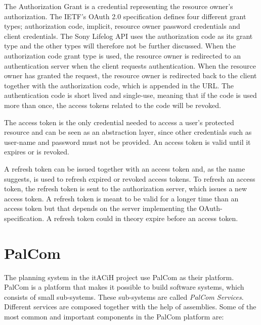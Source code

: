 \documentclass{cslthse-msc}
\begin{document}
The Authorization Grant is a credential representing the resource owner's authorization. The IETF's OAuth 2.0 specification defines four different grant types; authorization code, implicit, resource owner password credentials and client credentials. The Sony Lifelog API uses the authorization code as its grant type and the other types will therefore not be further discussed\cite{LifeLogAuth}. When the authorization code grant type is used, the resource owner is redirected to an authentication server when the client requests authentication. When the resource owner has granted the request, the resource owner is redirected back to the client together with the authorization code, which is appended in the URL. The authentication code is short lived and single-use, meaning that if the code is used more than once, the access tokens related to the code will be revoked.

The access token is the only credential needed to access a user's protected resource and can be seen as an abstraction layer, since other credentials such as user-name and password must not be provided. An access token is valid until it expires or is revoked.  

A refresh token can be issued together with an access token and, as the name suggests, is used to refresh expired or revoked access tokens. To refresh an access token, the refresh token is sent to the authorization server, which issues a new access token. A refresh token is meant to be valid for a longer time than an access token but that depends on the server implementing the OAuth-specification. A refresh token could in theory expire before an access token. 

\section{PalCom}
The planning system in the itACiH project use PalCom as their platform. PalCom is a platform that makes it possible to build software systems, which consists of small sub-systems\cite{ist-PalCom}. These sub-systems are called \emph{PalCom Services}. Different services are composed together with the help of assemblies. Some of the most common and important components in the PalCom platform are: 
\end{document}
